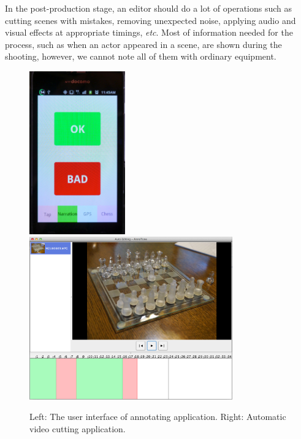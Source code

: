 In the post-production stage, an editor should do a lot of operations such as cutting scenes with mistakes, removing unexpected noise, applying audio and visual effects at appropriate timings, {\it etc}.
Most of information needed for the process, such as when an actor appeared in a scene, are shown during the shooting, however, we cannot note all of them with ordinary equipment.

\begin{figure}[htbp]
 \begin{center}
  \includegraphics[height=70mm]{application_edit_app.png}
  \includegraphics[height=70mm]{application_edit.png}
 \end{center}
 \caption{Left: The user interface of annotating application. Right: Automatic video cutting application.}
 \label{fig:appl_edit}
\end{figure}

